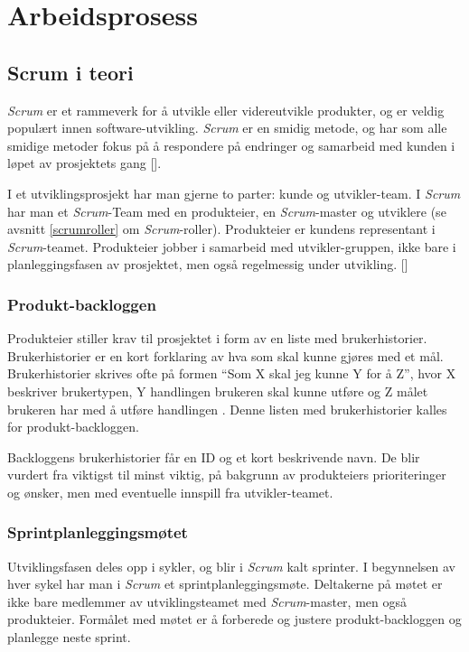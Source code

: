 \documentclass[12pt,a4paper,norsk]{article}
\begin{document}
	\section{Arbeidsprosess}
	\subsection{Scrum i teori}
	\textit{Scrum} er et rammeverk for å utvikle eller videreutvikle produkter, og er veldig populært innen software-utvikling. \textit{Scrum} er en smidig metode, og har som alle smidige metoder fokus på å respondere på endringer og samarbeid med kunden i løpet av prosjektets gang [\cite{agilemanifesto}].
	
	I et utviklingsprosjekt har man gjerne to parter: kunde og utvikler-team. I \textit{Scrum} har man et \textit{Scrum}-Team med en produkteier, en \textit{Scrum}-master og utviklere (se avsnitt \ref{scrumroller} om \textit{Scrum}-roller). Produkteier er kundens representant i \textit{Scrum}-teamet. Produkteier jobber i samarbeid med utvikler-gruppen, ikke bare i planleggingsfasen av prosjektet, men også regelmessig under utvikling.
	[\cite{scrumguides}]
	\subsubsection{Produkt-backloggen}
	Produkteier stiller krav til prosjektet i form av en liste med brukerhistorier. Brukerhistorier er en kort forklaring av hva som skal kunne gjøres med et mål.  Brukerhistorier skrives ofte på formen “Som X skal jeg kunne Y for å Z”, hvor X beskriver brukertypen, Y handlingen brukeren skal kunne utføre og Z målet brukeren har med å utføre handlingen \cite[side 9]{kniberg}. Denne listen med brukerhistorier kalles for produkt-backloggen.

    Backloggens brukerhistorier får en ID og et kort beskrivende navn. De blir vurdert fra viktigst til minst viktig, på bakgrunn av produkteiers prioriteringer og ønsker, men med eventuelle innspill fra utvikler-teamet.
	\subsubsection{Sprintplanleggingsmøtet}
	Utviklingsfasen deles opp i sykler, og blir i \textit{Scrum} kalt sprinter. I begynnelsen av hver sykel har man i \textit{Scrum} et sprintplanleggingsmøte. Deltakerne på møtet er ikke bare medlemmer av utviklingsteamet med \textit{Scrum}-master, men også produkteier. Formålet med møtet er å forberede og justere produkt-backloggen og planlegge neste sprint.
\end{document}
